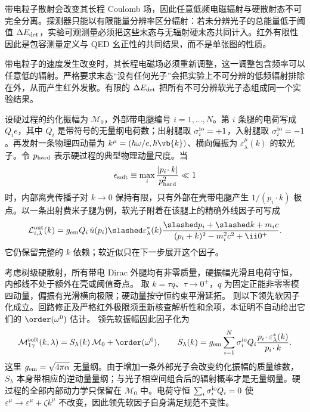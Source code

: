 带电粒子散射会改变其长程 Coulomb 场，因此任意低频电磁辐射与硬散射态不可完全分离。探测器只能以有限能量分辨率区分辐射：若未分辨光子的总能量低于阈值 $\Delta E_{\rm det}$，实验可观测量必须把这些末态与无辐射硬末态共同计入。红外有限性因此是包容测量定义与 QED 幺正性的共同结果，而不是单张图的性质。

带电粒子的速度发生改变时，其长程电磁场必须重新调整，这一调整包含频率可以任意低的辐射。严格要求末态“没有任何光子”会把实验上不可分辨的低频辐射排除在外，从而产生红外发散。有限的 $\Delta E_{\rm det}$ 把所有不可分辨软光子态组成同一个实验结果。


设硬过程的约化振幅为 $\mathcal M_0$，外部带电腿编号 $i=1,\ldots,N$。第 $i$ 条腿的电荷写成 $Q_i e$，其中 $Q_i$ 是带符号的无量纲电荷数；出射腿取 $\sigma_i^{\rm io}=+1$，入射腿取 $\sigma_i^{\rm io}=-1$。再发射一条物理四动量为
$k^\mu=(\hbar\omega/c,\hbar\vb{k})$、横向偏振为 $\varepsilon_\lambda^\mu(k)$ 的软光子。令 $p_{\rm hard}$ 表示硬过程的典型物理动量尺度。当
\[
 \epsilon_{\rm soft}\equiv
 \max_i\frac{|p_i\!\cdot k|}{p_{\rm hard}^2}\ll1
\]
时，内部离壳传播子对 $k\to0$ 保持有限，只有外部在壳带电腿产生 $1/(p_i\!\cdot k)$ 极点。以一条出射费米子腿为例，软光子附着在该腿上的精确外线因子可写成
\begin{equation}
 {
 \mathcal L_{i,\lambda}^{\rm out}(k)
 =g_{\rm em}Q_i\,
 \bar u(p_i)\slashed\varepsilon_\lambda^*(k)
 \frac{\slashed p_i+\slashed k+m_ic}
 {(p_i+k)^2-m_i^2c^2+\ii0^+}.}
 \label{eq:soft-external-leg-kernel-dp68}
\end{equation}
它仍保留完整的 $k$ 依赖；软近似只在下一步展开这个因子。\begin{theorem}
考虑树级硬散射，所有带电 Dirac 外腿均有非零质量，硬振幅光滑且电荷守恒，内部线不处于额外在壳或阈值奇点。
取 $k=\tau q$、$\tau\to0^+$，$q$ 为固定正能非零零模四动量，偏振有光滑横向极限；硬动量按守恒约束平滑延拓。
则以下领先软因子化成立。回路修正及严格红外极限须重新核查解析性和余项，本证明不自动给出它们的 $\order(\omega^0)$ 估计。
领先软振幅因此因子化为
\begin{equation}
 {
 \mathcal M_{1\gamma}^{\rm soft}(k,\lambda)
 =S_\lambda(k)\,\mathcal M_0+\order(\omega^0),
 \qquad
 S_\lambda(k)
 =g_{\rm em}\sum_{i=1}^{N}
 \sigma_i^{\rm io}Q_i
 \frac{p_i\!\cdot\varepsilon_\lambda^*(k)}{p_i\!\cdot k}.}
 \label{eq:weinberg-soft-photon-factor-dp10}
\end{equation}
这里 $g_{\rm em}=\sqrt{4\pi\alpha}$ 无量纲。由于增加一条外部光子会改变约化振幅的质量维数，$S_\lambda$ 本身带相应的逆动量量纲；与光子相空间组合后的辐射概率才是无量纲量。硬过程的全部内部动力学只保留在 $\mathcal M_0$ 中。电荷守恒
$\sum_i\sigma_i^{\rm io}Q_i=0$ 使 $\varepsilon^\mu\to\varepsilon^\mu+\zeta k^\mu$ 不改变，因此领先软因子自身满足规范不变性。
\end{theorem}
